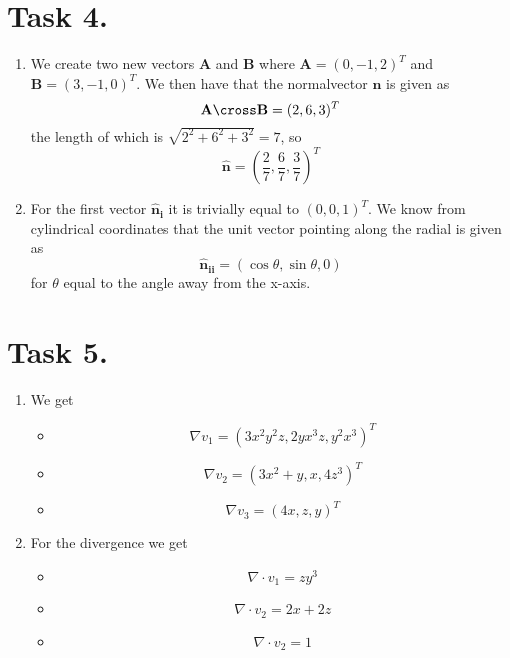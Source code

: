 \documentclass[a4paper,11pt]{article}
\begin{document}
\section*{Task 4.}
\begin{enumerate}
    \item We create two new vectors $\mathbf{A}$ and $\mathbf{B}$ where $\mathbf{A} = (0, -1, 2)^{T}$ 
        and $\mathbf{B} = (3, -1, 0)^{T}$. We then have that the normalvector $\mathbf{n}$ is given as 
        \[
            \mathbf{A} \cross \mathbf{B} = (2, 6, 3)^{T}
        \]
        the length of which is $\sqrt{2^2 + 6^2 + 3^2} = 7$, so
        \[
            \mathbf{\hat{n}} = \left(\frac{2}{7}, \frac{6}{7}, \frac{3}{7}\right)^{T}
        \]
    \item For the first vector $\mathbf{\hat{n}_i}$ it is trivially equal to $(0, 0, 1)^{T}$.
        We know from cylindrical coordinates that the unit vector pointing along the radial is given as
        \[
            \mathbf{\hat{n}_{ii}} = (\cos{\theta}, \sin{\theta}, 0)
        \]
        for $\theta$ equal to the angle away from the x-axis.
\end{enumerate}

\section*{Task 5.}
\begin{enumerate}
    \item We get 
        \begin{itemize}
            \item 
                \[
                    \nabla v_1 = (3x^2y^2z, 2yx^3z, y^2x^3)^{T}
                \]
            \item 
                \[
                    \nabla v_2 = (3x^2 + y, x, 4z^3)^{T}
                \]
            \item 
                \[
                    \nabla v_3 = (4x, z, y)^{T}
                \]
        \end{itemize}
    \item For the divergence we get
        \begin{itemize}
            \item 
                \[
                    \nabla \cdot v_1 = zy^3
                \]
            \item 
                \[
                    \nabla \cdot v_2 = 2x + 2z
                \]
            \item 
                \[
                    \nabla \cdot v_2 = 1
                \]
        \end{itemize}
\end{enumerate}
\end{document}
